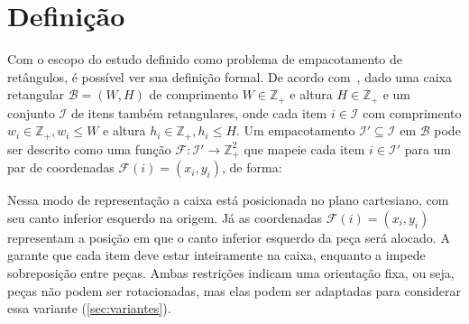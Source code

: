 \section{Definição}\label{sec:definicao}

Com o escopo do estudo definido como problema de empacotamento de retângulos, é possível ver sua
definição formal.
De acordo com~\cite{2DPackLib}, dado uma caixa retangular $\mathcal{B} = (W, H)$ de comprimento
$W \in \mathbb{Z}_+$ e altura $H \in \mathbb{Z}_+$ e um conjunto $\mathcal{I}$ de itens também
retangulares, onde cada item $i \in \mathcal{I}$ com comprimento $w_i \in \mathbb{Z}_+, w_i \le W$
e altura $h_i \in \mathbb{Z}_+, h_i \le H$.
Um empacotamento $\mathcal{I}' \subseteq \mathcal{I}$ em $\mathcal{B}$ pode ser descrito como uma função
$\mathcal{F}: \mathcal{I}' \to \mathbb{Z}_+^2$ que mapeie cada item $i \in \mathcal{I}'$ para um par
de coordenadas $\mathcal{F}(i) = (x_i, y_i)$, de forma:



Nessa modo de representação a caixa está posicionada no plano cartesiano, com seu canto inferior
esquerdo na origem.
Já as coordenadas $\mathcal{F}(i) = (x_i, y_i)$ representam a posição em que o canto inferior
esquerdo da peça será alocado.
A  garante que cada item deve estar inteiramente na caixa, enquanto a 
impede sobreposição entre peças.
Ambas restrições indicam uma orientação fixa, ou seja, peças não podem ser rotacionadas, mas elas
podem ser adaptadas para considerar essa variante (\cref{sec:variantes}).
